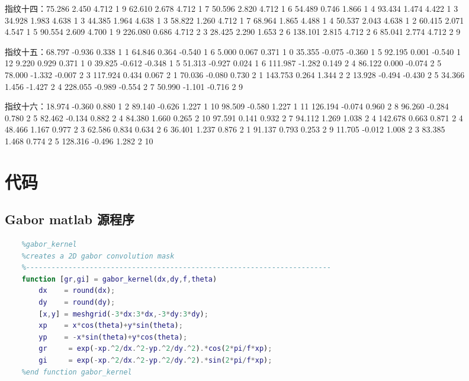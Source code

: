 \documentclass{whutmod}
\begin{document}
\begin{spacing}{1.2}
\begin{figure}[H]
指纹十四：75.286 2.450 4.712 1 9
62.610 2.678 4.712 1 7
50.596 2.820 4.712 1 6
54.489 0.746 1.866 1 4
93.434 1.474 4.422 1 3
34.928 1.983 4.638 1 3
44.385 1.964 4.638 1 3
58.822 1.260 4.712 1 7
68.964 1.865 4.488 1 4
50.537 2.043 4.638 1 2
60.415 2.071 4.547 1 5
90.554 2.609 4.700 1 9
226.080 0.686 4.712 2 3
28.425 2.290 1.653 2 6
138.101 2.815 4.712 2 6
85.041 2.774 4.712 2 9


指纹十五：68.797 -0.936 0.338 1 1
64.846 0.364 -0.540 1 6
5.000 0.067 0.371 1 0
35.355 -0.075 -0.360 1 5
92.195 0.001 -0.540 1 12
9.220 0.929 0.371 1 0
39.825 -0.612 -0.348 1 5
51.313 -0.927 0.024 1 6
111.987 -1.282 0.149 2 4
86.122 0.000 -0.074 2 5
78.000 -1.332 -0.007 2 3
117.924 0.434 0.067 2 1
70.036 -0.080 0.730 2 1
143.753 0.264 1.344 2 2
13.928 -0.494 -0.430 2 5
34.366 1.456 -1.427 2 4
228.055 -0.989 -0.554 2 7
50.990 -1.101 -0.716 2 9


指纹十六：18.974 -0.360 0.880 1 2
89.140 -0.626 1.227 1 10
98.509 -0.580 1.227 1 11
126.194 -0.074 0.960 2 8
96.260 -0.284 0.780 2 5
82.462 -0.134 0.882 2 4
84.380 1.660 0.265 2 10
97.591 0.141 0.932 2 7
94.112 1.269 1.038 2 4
142.678 0.663 0.871 2 4
48.466 1.167 0.977 2 3
62.586 0.834 0.634 2 6
36.401 1.237 0.876 2 1
91.137 0.793 0.253 2 9
11.705 -0.012 1.008 2 3
83.385 1.468 0.774 2 5
128.316 -0.496 1.282 2 10




\section{代码}
\subsection{Gabor matlab 源程序}
\begin{lstlisting}[language=matlab]
	%------------------------------------------------------------------------
	%gabor_kernel
	%creates a 2D gabor convolution mask
	%------------------------------------------------------------------------
	function [gr,gi] = gabor_kernel(dx,dy,f,theta)
		dx    = round(dx);
		dy    = round(dy);
		[x,y] = meshgrid(-3*dx:3*dx,-3*dy:3*dy);
		xp    = x*cos(theta)+y*sin(theta);
		yp    = -x*sin(theta)+y*cos(theta);
		gr     = exp(-xp.^2/dx.^2-yp.^2/dy.^2).*cos(2*pi/f*xp);
		gi     = exp(-xp.^2/dx.^2-yp.^2/dy.^2).*sin(2*pi/f*xp);
	%end function gabor_kernel

	
\end{lstlisting}


\end{figure}
\end{spacing}
\end{document}
